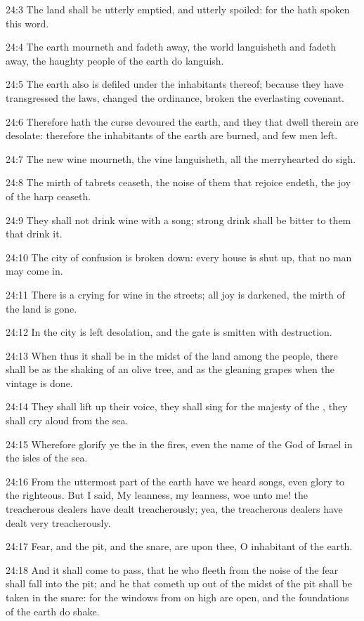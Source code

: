 24:3 The land shall be utterly emptied, and utterly spoiled: for the \LORD hath spoken this word.

24:4 The earth mourneth and fadeth away, the world languisheth and fadeth away, the haughty people of the earth do languish.

24:5 The earth also is defiled under the inhabitants thereof; because they have transgressed the laws, changed the ordinance, broken the everlasting covenant.

24:6 Therefore hath the curse devoured the earth, and they that dwell therein are desolate: therefore the inhabitants of the earth are burned, and few men left.

24:7 The new wine mourneth, the vine languisheth, all the merryhearted do sigh.

24:8 The mirth of tabrets ceaseth, the noise of them that rejoice endeth, the joy of the harp ceaseth.

24:9 They shall not drink wine with a song; strong drink shall be bitter to them that drink it.

24:10 The city of confusion is broken down: every house is shut up, that no man may come in.

24:11 There is a crying for wine in the streets; all joy is darkened, the mirth of the land is gone.

24:12 In the city is left desolation, and the gate is smitten with destruction.

24:13 When thus it shall be in the midst of the land among the people, there shall be as the shaking of an olive tree, and as the gleaning grapes when the vintage is done.

24:14 They shall lift up their voice, they shall sing for the majesty of the \LORD, they shall cry aloud from the sea.

24:15 Wherefore glorify ye the \LORD in the fires, even the name of the \LORD God of Israel in the isles of the sea.

24:16 From the uttermost part of the earth have we heard songs, even glory to the righteous. But I said, My leanness, my leanness, woe unto me! the treacherous dealers have dealt treacherously; yea, the treacherous dealers have dealt very treacherously.

24:17 Fear, and the pit, and the snare, are upon thee, O inhabitant of the earth.

24:18 And it shall come to pass, that he who fleeth from the noise of the fear shall fall into the pit; and he that cometh up out of the midst of the pit shall be taken in the snare: for the windows from on high are open, and the foundations of the earth do shake.

